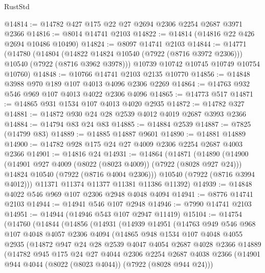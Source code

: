 \begin{lexlean}{RustStd}
\begin{coremodule}
@14814 := @14782 @427 @175 @22 @27 @2694 @2306 @2254 @2687 @3971 @2366
@14816 := @8014 @14741 @2103
@14822 := @14814 (@14816 @22 @426 @2694 @10486 @10490)
@14824 := @8097 @14741 @2103
@14844 := @14771
    (@14780
      (@14804 (@14822 @14824 @10540 (@7922 (@8716 @3972 @2306))) @10540 (@7922 (@8716 @3962 @3978)))
      @10739
      @10742
      @10745
      @10749
      @10754
      @10760)
@14848 := @10766 @14741 @2103 @2135 @10770
@14856 := @14848 @3988 @970 @189 @107 @4013 @4096 @2306 @2269
@14864 := @14763 @932 @546 @969 @107 @4013 @4022 @2306 @4096
@14865 := @14773 @517
@14871 := @14865 @931 @1534 @107 @4013 @4020 @2935
@14872 := @14782 @327
@14881 := @14872 @930 @24 @28 @2539 @4012 @4019 @2687 @3993 @2366
@14884 := @14794 @83 @24 @83
@14885 := @14884 @2539
@14887 := @7825 (@14799 @83)
@14889 := @14885 @14887 @9601
@14890 := @14881 @14889
@14900 := @14782 @928 @175 @24 @27 @4009 @2306 @2254 @2687 @4003 @2366
@14901 := @14816 @24
@14931 := @14864
    (@14871
      (@14890
        (@14900
          (@14901 @927 @4009 (@8022 (@8023 @4009)) (@7922 (@8028 @927 @24)))
          @14824
          @10540
          (@7922 (@8716 @4004 @2306)))
        @10540
        (@7922 (@8716 @3994 @4012)))
      @11371
      @11374
      @11377
      @11381
      @11386
      @11392)
@14939 := @14848 @4022 @546 @969 @107 @2306 @2948 @4048 @4094
@14941 := @8776 @14741 @2103
@14944 := @14941 @546 @107 @2948
@14946 := @7990 @14741 @2103
@14951 := @14944 (@14946 @543 @107 @2947 @11419)
@15104 := @14754
    (@14760
      (@14844
        (@14856
          (@14931
            (@14939
              @14951
              (@14763
                @949
                @546
                @968
                @107
                @4048
                @4057
                @2306
                @4094
                (@14865
                  @948
                  @1534
                  @107
                  @4048
                  @4055
                  @2935
                  (@14872
                    @947
                    @24
                    @28
                    @2539
                    @4047
                    @4054
                    @2687
                    @4028
                    @2366
                    @14889
                    (@14782
                      @945
                      @175
                      @24
                      @27
                      @4044
                      @2306
                      @2254
                      @2687
                      @4038
                      @2366
                      (@14901 @944 @4044 (@8022 (@8023 @4044)) (@7922 (@8028 @944 @24)))

\end{coremodule}
\end{lexlean}
